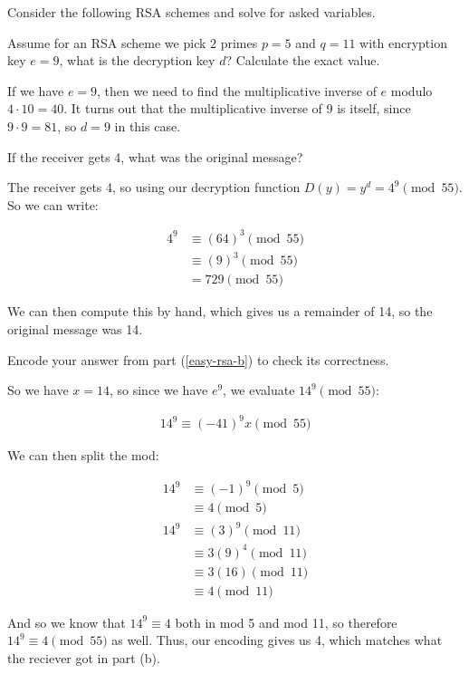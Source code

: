 \documentclass[11pt]{article}
\begin{document}
Consider the following RSA schemes and solve for asked variables.
\begin{Parts}
 
    \Part Assume for an RSA scheme we pick $2$ primes $p = 5$ and $q = 11$ with encryption key $e = 9$, what is the decryption key $d$? Calculate the exact value.

    \begin{solution}
        If we have $e = 9$, then we need to find the multiplicative inverse of $e$ modulo $4\cdot 10 = 40$. It turns out that the multiplicative inverse of 9 is itself, since $9 \cdot 9 = 81$, so $d=9$ in this case.
    \end{solution}
    
    
    \Part If the receiver gets 4, what was the original message? \label{easy-rsa-b}


    \begin{solution}
        The receiver gets 4, so using our decryption function $D(y) = y^d = 4^9 \pmod{55}$. So we can write:

        \begin{align*}
            4^9 &\equiv (64)^3 \pmod{55}\\
            &\equiv (9)^3 \pmod {55}\\
            &= 729 \pmod{55}
        \end{align*}

        We can then compute this by hand, which gives us a remainder of 14, so the original message was 14.
    \end{solution}
    
    
    \Part Encode your answer from part (\ref{easy-rsa-b}) to check its correctness.

    \begin{solution}
        So we have $x = 14$, so since we have $e^9$, we evaluate $14^9 \pmod {55}$:

        \begin{align*}
            14^9 \equiv (-41)^{9}x \pmod{55}
        \end{align*}

        We can then split the mod:

        \begin{align*}
            14^9 &\equiv (-1)^9 \pmod{5}\\
            &\equiv 4 \pmod{5}\\
            14^9 &\equiv (3)^9 \pmod{11}\\
            &\equiv 3(9)^4 \pmod{11}\\
            &\equiv 3(16) \pmod{11}\\
            &\equiv 4 \pmod{11}
        \end{align*}

        And so we know that $14^9 \equiv 4$ both in mod 5 and mod 11, so therefore $14^9 \equiv 4 \pmod{55}$ as well. Thus, our encoding gives us 4, which matches what the reciever got in part (b).
    \end{solution}
    
\end{Parts}
\end{document}
